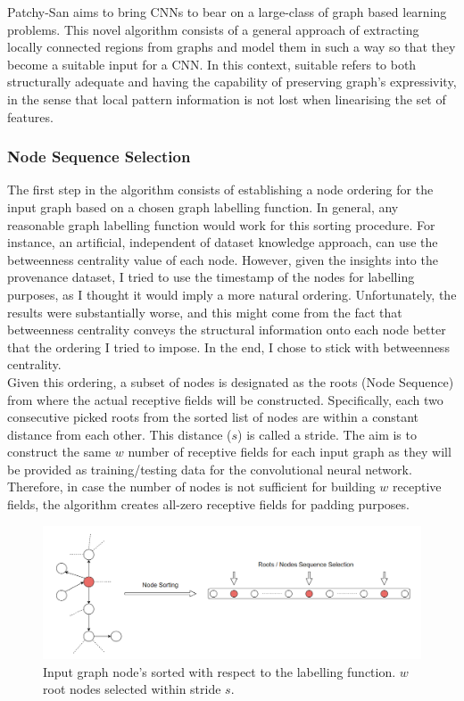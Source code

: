 Patchy-San aims to bring CNNs to bear on a large-class of graph based learning problems. This novel algorithm consists of a general approach of extracting locally connected regions from graphs and model them in such a way so that they become a suitable input for a CNN. In this context, suitable refers to both structurally adequate and having the capability of preserving graph's expressivity, in the sense that local pattern information is not lost when linearising the set of features. 


\subsubsection*{Node Sequence Selection} \label{node_seq_sel}

The first step in the algorithm consists of establishing a node ordering for the input graph based on a chosen graph labelling function. In general, any reasonable graph labelling function would work for this sorting procedure. For instance, an artificial, independent of dataset knowledge approach, can use the betweenness centrality value of each node. However, given the insights into the provenance dataset, I tried to use the timestamp of the nodes for labelling purposes, as I thought it would imply a more natural ordering. Unfortunately, the results were substantially worse, and this might come from the fact that betweenness centrality conveys the structural information onto each node better that the ordering I tried to impose. In the end, I chose to stick with betweenness centrality. \\

Given this ordering, a subset of nodes is designated as the roots (Node Sequence) from where the actual receptive fields will be constructed. Specifically, each two consecutive picked roots from the sorted list of nodes are within a constant distance from each other. This distance ($s$) is called a stride. The aim is to construct the same $w$ number of receptive fields for each input graph as they will be provided as training/testing data for the convolutional neural network. Therefore, in case the number of nodes is not sufficient for building $w$ receptive fields, the algorithm creates all-zero receptive fields for padding purposes. 

\begin{figure}[H]
  \centering
  \includegraphics[scale=0.4]{Images/nodeseqsel.png}
  \caption{Input graph node's sorted with respect to the labelling function. $w$ root nodes selected within stride $s$.}
  \label{nodeseqsel}
\end{figure}

